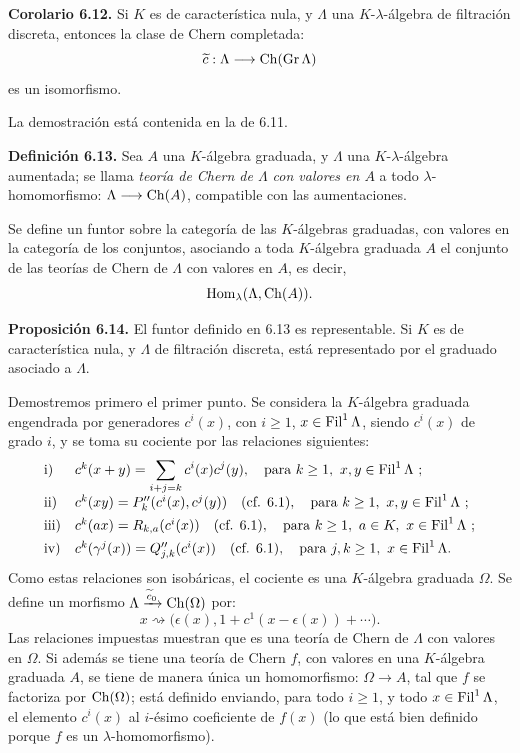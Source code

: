 \textbf{Corolario 6.12.} Si \(K\) es de característica nula, y \(\Lambda\) una \(K\)-\(\lambda\)-álgebra de filtración discreta, entonces la clase de Chern completada:
\[
  \widetilde c:\Lambda\longrightarrow \Ch(\Gr\Lambda)
\]
es un isomorfismo.

La demostración está contenida en la de 6.11.

\textbf{Definición 6.13.} Sea \(A\) una \(K\)-álgebra graduada, y \(\Lambda\) una \(K\)-\(\lambda\)-álgebra aumentada; se llama \emph{teoría de Chern de \(\Lambda\) con valores en \(A\)} a todo \(\lambda\)-homomorfismo: \(\Lambda\longrightarrow \Ch(A)\), compatible con las aumentaciones.

Se define un funtor sobre la categoría de las \(K\)-álgebras graduadas, con valores en la categoría de los conjuntos, asociando a toda \(K\)-álgebra graduada \(A\) el conjunto de las teorías de Chern de \(\Lambda\) con valores en \(A\), es decir,
\[
  \Hom_\lambda(\Lambda,\Ch(A)).
\]

\textbf{Proposición 6.14.} El funtor definido en 6.13 es representable. Si \(K\) es de característica nula, y \(\Lambda\) de filtración discreta, está representado por el graduado asociado a \(\Lambda\).

Demostremos primero el primer punto. Se considera la \(K\)-álgebra graduada engendrada por generadores \(c^i(x)\), con \(i\ge1\), \(x\in\Fil^1\Lambda\), siendo \(c^i(x)\) de grado \(i\), y se toma su cociente por las relaciones siguientes:
\[
\begin{array}{ll}
\text{i)}&
 c^k(x+y)=\displaystyle\sum_{i+j=k}c^i(x)c^j(y),
 \quad\text{para } k\ge1,\ x,y\in\Fil^1\Lambda\ ;\\[0.8em]
\text{ii)}&
 c^k(xy)=P''_k(c^i(x),c^j(y))
 \quad(\text{cf. }6.1),
 \quad\text{para } k\ge1,\ x,y\in\Fil^1\Lambda\ ;\\[0.4em]
\text{iii)}&
 c^k(ax)=\sisi{R_{k,a}(c^i(x)}{R_{k,a}(c^i(x))}
 \quad(\text{cf. }6.1),
 \quad\text{para } k\ge1,\ a\in K,\ x\in\Fil^1\Lambda\ ;\\[0.4em]
\text{iv)}&
 c^k(\gamma^j(x))=Q''_{j,k}(c^i(x))
 \quad(\text{cf. }6.1),
 \quad\text{para } j,k\ge1,\ x\in\Fil^1\Lambda.
\end{array}
\]
Como estas relaciones son isobáricas, el cociente es una \(K\)-álgebra graduada \(\Omega\). Se define un morfismo \(\Lambda\xrightarrow{\widetilde c_0}\Ch(\Omega)\) por:
\[
  x\rightsquigarrow
  \bigl(\epsilon(x),1+c^1(x-\epsilon(x))+\cdots\bigr).
\]
Las relaciones impuestas muestran que es una teoría de Chern de \(\Lambda\) con valores en \(\Omega\). Si además se tiene una teoría de Chern \(f\), con valores en una \(K\)-álgebra graduada \(A\), se tiene de manera única un homomorfismo: \(\Omega\to A\), tal que \(f\) se factoriza por \(\Ch(\Omega)\); está definido enviando, para todo \(i\ge1\), y todo \(x\in\Fil^1\Lambda\), el elemento \(c^i(x)\) al \(i\)-ésimo coeficiente de \(f(x)\) (lo que está bien definido porque \(f\) es un \(\lambda\)-homomorfismo).

